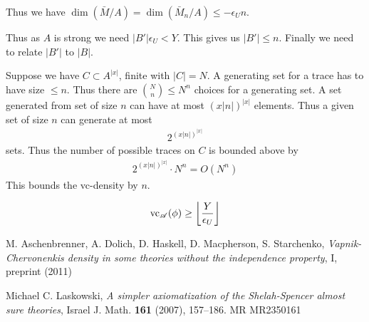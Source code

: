 \documentclass{amsart}
\renewcommand{\AA}{\mathscr A}
\providecommand{\floor}[1]{\left \lfloor #1 \right \rfloor }
\begin{document}
Thus we have $\dim(\bar M / A) = \dim(\bar M_n / A) \leq -\epsilon_U n$.

Thus as $A$ is strong we need $|B'| \epsilon_U < Y$.
This gives us $|B'| \leq n$.
Finally we need to relate $|B'|$ to $|B|$.

Suppose we have $C \subset A^{|x|}$, finite with $|C| = N$.
A generating set for a trace has to have size $\leq n$.
Thus there are ${N \choose n} \leq N^n$ choices for a generating set.
A set generated from set of size $n$ can have at most $(x|n|)^{|x|}$ elements.
Thus a given set of size $n$ can generate at most
\begin{align*}
	2^{(x|n|)^{|x|}}
\end{align*}
sets.
Thus the number of possible traces on $C$ is bounded above by
\begin{align*}
  2^{(x|n|)^{|x|}} \cdot N^n = O(N^n)
\end{align*}
This bounds the vc-density by $n$.

\begin{align*}
	\vc_\AA(\phi) \geq \floor{\frac{Y}{\epsilon_U}}
\end{align*}


\begin{thebibliography}{9}

	M. Aschenbrenner, A. Dolich, D. Haskell, D. Macpherson, S. Starchenko,
	\textit{Vapnik-Chervonenkis density in some theories without the independence property}, I, preprint (2011)
	
  Michael C. Laskowski, \textit{A simpler axiomatization of the Shelah-Spencer almost sure theories},
  Israel J. Math. \textbf{161} (2007), 157–186. MR MR2350161	

\end{thebibliography}
	
\end{document}
